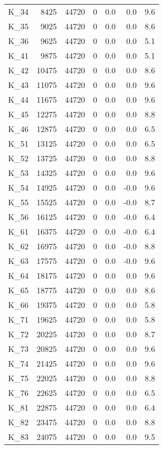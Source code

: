 \begin{tabular}{lrrrrrr}
K\_34 & 8425 & 44720 & 0 & 0.0 & 0.0 & 9.6 \\
K\_35 & 9025 & 44720 & 0 & 0.0 & 0.0 & 8.6 \\
K\_36 & 9625 & 44720 & 0 & 0.0 & 0.0 & 5.1 \\
K\_41 & 9875 & 44720 & 0 & 0.0 & 0.0 & 5.1 \\
K\_42 & 10475 & 44720 & 0 & 0.0 & 0.0 & 8.6 \\
K\_43 & 11075 & 44720 & 0 & 0.0 & 0.0 & 9.6 \\
K\_44 & 11675 & 44720 & 0 & 0.0 & 0.0 & 9.6 \\
K\_45 & 12275 & 44720 & 0 & 0.0 & 0.0 & 8.8 \\
K\_46 & 12875 & 44720 & 0 & 0.0 & 0.0 & 6.5 \\
K\_51 & 13125 & 44720 & 0 & 0.0 & 0.0 & 6.5 \\
K\_52 & 13725 & 44720 & 0 & 0.0 & 0.0 & 8.8 \\
K\_53 & 14325 & 44720 & 0 & 0.0 & 0.0 & 9.6 \\
K\_54 & 14925 & 44720 & 0 & 0.0 & -0.0 & 9.6 \\
K\_55 & 15525 & 44720 & 0 & 0.0 & -0.0 & 8.7 \\
K\_56 & 16125 & 44720 & 0 & 0.0 & -0.0 & 6.4 \\
K\_61 & 16375 & 44720 & 0 & 0.0 & -0.0 & 6.4 \\
K\_62 & 16975 & 44720 & 0 & 0.0 & -0.0 & 8.8 \\
K\_63 & 17575 & 44720 & 0 & 0.0 & -0.0 & 9.6 \\
K\_64 & 18175 & 44720 & 0 & 0.0 & 0.0 & 9.6 \\
K\_65 & 18775 & 44720 & 0 & 0.0 & 0.0 & 8.6 \\
K\_66 & 19375 & 44720 & 0 & 0.0 & 0.0 & 5.8 \\
K\_71 & 19625 & 44720 & 0 & 0.0 & 0.0 & 5.8 \\
K\_72 & 20225 & 44720 & 0 & 0.0 & 0.0 & 8.7 \\
K\_73 & 20825 & 44720 & 0 & 0.0 & 0.0 & 9.6 \\
K\_74 & 21425 & 44720 & 0 & 0.0 & 0.0 & 9.6 \\
K\_75 & 22025 & 44720 & 0 & 0.0 & 0.0 & 8.8 \\
K\_76 & 22625 & 44720 & 0 & 0.0 & 0.0 & 6.5 \\
K\_81 & 22875 & 44720 & 0 & 0.0 & 0.0 & 6.4 \\
K\_82 & 23475 & 44720 & 0 & 0.0 & 0.0 & 8.8 \\
K\_83 & 24075 & 44720 & 0 & 0.0 & 0.0 & 9.5 \\

\end{tabular}
